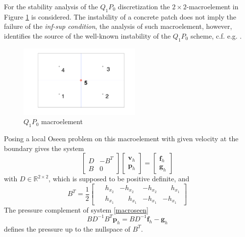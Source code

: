 \documentclass[a4paper,10pt,BCOR=15mm]{scrbook}
\begin{document}
For the stability analysis of the $Q_1P_0$ discretization the $2\times2$-macroelement in Figure \ref{q1p0mac} is considered. The instability of a concrete patch does not imply the failure of the \textit{inf-sup condition}, the analysis of such macroelement, however, identifies the source of the well-known instability of the $Q_1P_0$ scheme, c.f. e.g. \cite{brhu,gunipe,sani}.

\begin{figure}[htbp]
  \centering
  \begin{minipage}[b]{6 cm}
    \includegraphics[width=6cm]{pics/q1p0/q1p0mac.pdf}  
  \end{minipage}
  \caption{$Q_1P_0$ macroelement} 
\label{q1p0mac}
\end{figure}

Posing a local Oseen problem on this macroelement with given velocity at the boundary gives the system 
\begin{equation}\label{macroseen}
 \begin{bmatrix} D & -B^T \\ B &  0 \end{bmatrix} \begin{bmatrix} \mathbf v_h \\ \mathbf p_h \end{bmatrix} = \begin{bmatrix} \mathbf
f_h \\ \mathbf g_h \end{bmatrix}
\end{equation}
with $D \in \mathbb R^{2\times2}$, which is supposed to be positive definite, and 
\begin{equation}\label{gradmac}
 B^T = \frac{1}{2} \begin{bmatrix} \phantom{-}h_{x_2}&-h_{x_2}&-h_{x_2}&\phantom{-}h_{x_1} \\ \phantom{-}h_{x_1}&\phantom{-}h_{x_1}&-h_{x_1}&-h_{x_1} \end{bmatrix}
\end{equation}
The pressure complement of system \eqref{macroseen} 
\begin{equation*}
 BD^{-1}B^T\mathbf p_h = BD^{-1}\mathbf f_h - \mathbf g_h
\end{equation*}
defines the pressure up to the nullspace of $B^T$. 
\end{document}
